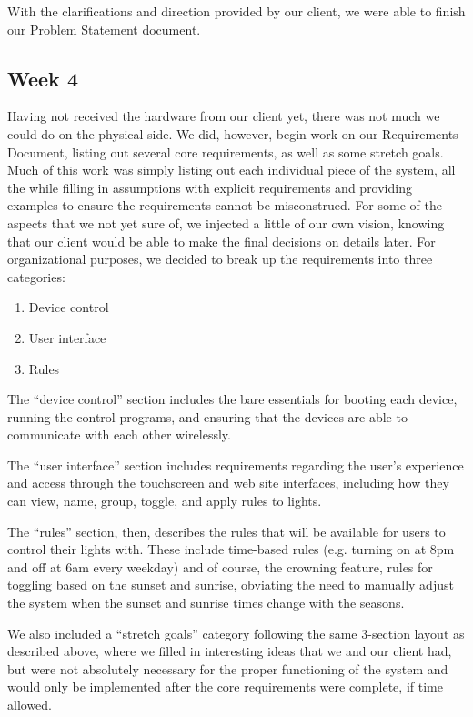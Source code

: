 \documentclass[letterpaper,10pt]{article}
\begin{document}
With the clarifications and direction provided by our client, we were able to finish our Problem Statement document.

\subsection{Week 4}
 
Having not received the hardware from our client yet, there was not much we
could do on the physical side.  We did, however, begin work on our Requirements
Document, listing out several core requirements, as well as some stretch goals.
Much of this work was simply listing out each individual piece of the system,
all the while filling in assumptions with explicit requirements and providing
examples to ensure the requirements cannot be misconstrued.  For some of the
aspects that we not yet sure of, we injected a little of our own vision,
knowing that our client would be able to make the final decisions on details
later.  For organizational purposes, we decided to break up the requirements
into three categories:

\begin{enumerate}
    \item Device control
    \item User interface
    \item Rules
\end{enumerate}

The ``device control'' section includes the bare essentials for booting each
device, running the control programs, and ensuring that the devices are able to
communicate with each other wirelessly.

The ``user interface'' section includes requirements regarding the user's
experience and access through the touchscreen and web site interfaces,
including how they can view, name, group, toggle, and apply rules to lights.

The ``rules'' section, then, describes the rules that will be available for
users to control their lights with.  These include time-based rules (e.g.
turning on at 8pm and off at 6am every weekday) and of course, the crowning
feature, rules for toggling based on the sunset and sunrise, obviating the need
to manually adjust the system when the sunset and sunrise times change with the
seasons.

We also included a ``stretch goals'' category following the same 3-section
layout as described above, where we filled in interesting ideas that we and our
client had, but were not absolutely necessary for the proper functioning of the
system and would only be implemented after the core requirements were complete,
if time allowed.
\end{document}
